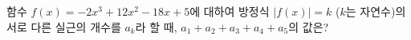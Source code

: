 함수 $f(x)=-2x^3+12x^2-18x+5$에 대하여 방정식 $|f(x)|=k$ ($k$는 자연수)의 서로 다른 실근의 개수를 $a_k$라 할 때, $a_1+a_2+a_3+a_4+a_5$의 값은?
